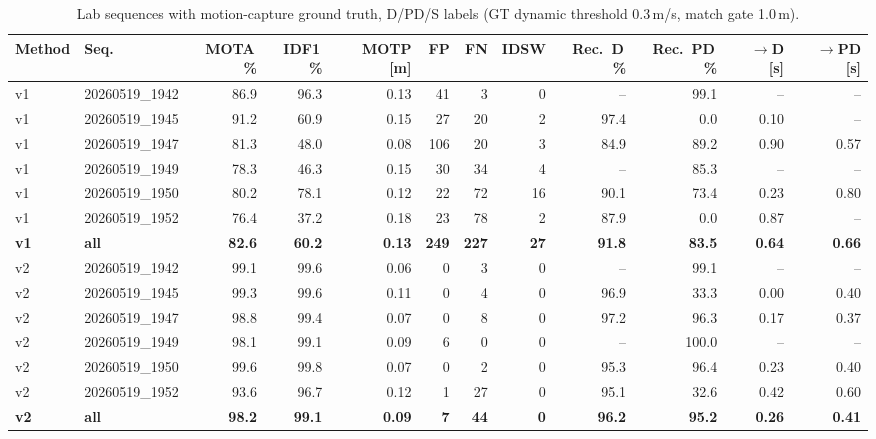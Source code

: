 \begin{table}[t]
\centering
\caption{Lab sequences with motion-capture ground truth, D/PD/S labels (GT dynamic threshold 0.3\,m/s, match gate 1.0\,m).}
\label{tab:own_r9a_full}
\setlength{\tabcolsep}{3pt}
\begin{tabular}{llrrrrrrrrrr}
\toprule
Method & Seq. & MOTA\,\% & IDF1\,\% & MOTP [m] & FP & FN & IDSW & Rec.\ D\,\% & Rec.\ PD\,\% & $\to$D [s] & $\to$PD [s] \\
\midrule
v1 & 20260519\_1942 & 86.9 & 96.3 & 0.13 & 41 & 3 & 0 & -- & 99.1 & -- & -- \\
v1 & 20260519\_1945 & 91.2 & 60.9 & 0.15 & 27 & 20 & 2 & 97.4 & 0.0 & 0.10 & -- \\
v1 & 20260519\_1947 & 81.3 & 48.0 & 0.08 & 106 & 20 & 3 & 84.9 & 89.2 & 0.90 & 0.57 \\
v1 & 20260519\_1949 & 78.3 & 46.3 & 0.15 & 30 & 34 & 4 & -- & 85.3 & -- & -- \\
v1 & 20260519\_1950 & 80.2 & 78.1 & 0.12 & 22 & 72 & 16 & 90.1 & 73.4 & 0.23 & 0.80 \\
v1 & 20260519\_1952 & 76.4 & 37.2 & 0.18 & 23 & 78 & 2 & 87.9 & 0.0 & 0.87 & -- \\
\textbf{v1} & \textbf{all} & \textbf{82.6} & \textbf{60.2} & \textbf{0.13} & \textbf{249} & \textbf{227} & \textbf{27} & \textbf{91.8} & \textbf{83.5} & \textbf{0.64} & \textbf{0.66} \\
\midrule
v2 & 20260519\_1942 & 99.1 & 99.6 & 0.06 & 0 & 3 & 0 & -- & 99.1 & -- & -- \\
v2 & 20260519\_1945 & 99.3 & 99.6 & 0.11 & 0 & 4 & 0 & 96.9 & 33.3 & 0.00 & 0.40 \\
v2 & 20260519\_1947 & 98.8 & 99.4 & 0.07 & 0 & 8 & 0 & 97.2 & 96.3 & 0.17 & 0.37 \\
v2 & 20260519\_1949 & 98.1 & 99.1 & 0.09 & 6 & 0 & 0 & -- & 100.0 & -- & -- \\
v2 & 20260519\_1950 & 99.6 & 99.8 & 0.07 & 0 & 2 & 0 & 95.3 & 96.4 & 0.23 & 0.40 \\
v2 & 20260519\_1952 & 93.6 & 96.7 & 0.12 & 1 & 27 & 0 & 95.1 & 32.6 & 0.42 & 0.60 \\
\textbf{v2} & \textbf{all} & \textbf{98.2} & \textbf{99.1} & \textbf{0.09} & \textbf{7} & \textbf{44} & \textbf{0} & \textbf{96.2} & \textbf{95.2} & \textbf{0.26} & \textbf{0.41} \\
\bottomrule
\end{tabular}
\end{table}

